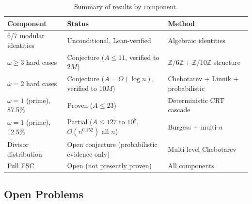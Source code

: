 \documentclass[11pt,a4paper]{article}
\theoremstyle{plain}
\theoremstyle{plain}
\theoremstyle{definition}
\numberwithin{equation}{section}
\begin{document}
\begin{table}[h]
\centering
\begin{tabular}{lll}
\toprule
Component & Status & Method \\
\midrule
6/7 modular identities & Unconditional, Lean-verified & Algebraic identities \\
$\omega \geq 3$ hard cases & Conjecture ($A \leq 11$, verified to $2M$) & $\mathbb{Z}/6\mathbb{Z} + \mathbb{Z}/10\mathbb{Z}$ structure \\
$\omega = 2$ hard cases & Conjecture ($A = O(\log n)$, verified to $10M$) & Chebotarev $+$ Linnik $+$ probabilistic \\
$\omega = 1$ (prime), 87.5\% & Proven ($A \leq 23$) & Deterministic CRT cascade \\
$\omega = 1$ (prime), 12.5\% & Partial ($A \leq 127$ to $10^8$, $O(n^{0.152})$ all $n$) & Burgess $+$ multi-$u$ \\
Divisor distribution & Open conjecture (probabilistic evidence only) & Multi-level Chebotarev \\
Full ESC & Open (not presently proven) & All components \\
\bottomrule
\end{tabular}
\caption{Summary of results by component.}
\end{table}

\subsection{Open Problems}
\end{document}
